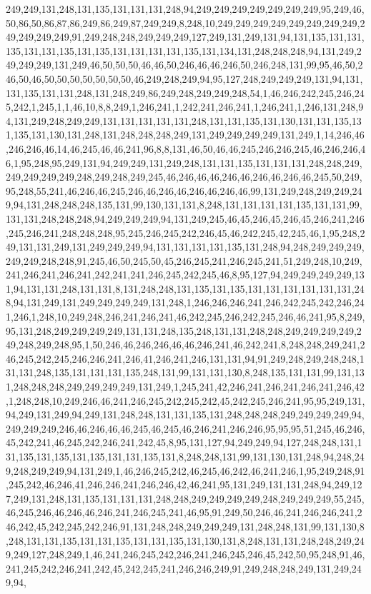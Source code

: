 249,249,131,248,131,135,131,131,131,248,94,249,249,249,249,249,249,249,95,249,46,50,86,50,86,87,86,249,86,249,87,249,249,8,248,10,249,249,249,249,249,249,249,249,249,249,249,249,91,249,248,248,249,249,249,127,249,131,249,131,94,131,135,131,131,135,131,131,135,131,135,131,131,131,131,135,131,134,131,248,248,248,94,131,249,249,249,249,131,249,46,50,50,50,46,46,50,246,46,46,246,50,246,248,131,99,95,46,50,246,50,46,50,50,50,50,50,50,50,46,249,248,249,94,95,127,248,249,249,249,131,94,131,131,135,131,131,248,131,248,249,86,249,248,249,249,248,54,1,46,246,242,245,246,245,242,1,245,1,1,46,10,8,8,249,1,246,241,1,242,241,246,241,1,246,241,1,246,131,248,94,131,249,248,249,249,131,131,131,131,131,248,131,131,135,131,130,131,131,135,131,135,131,130,131,248,131,248,248,248,249,131,249,249,249,249,131,249,1,14,246,46,246,246,46,14,46,245,46,46,241,96,8,8,131,46,50,46,46,245,246,246,245,46,246,246,46,1,95,248,95,249,131,94,249,249,131,249,248,131,131,135,131,131,131,248,248,249,249,249,249,249,248,249,248,249,245,46,246,46,46,246,46,246,46,246,46,245,50,249,95,248,55,241,46,246,46,245,246,46,246,46,246,46,246,46,99,131,249,248,249,249,249,94,131,248,248,248,135,131,99,130,131,131,8,248,131,131,131,131,135,131,131,99,131,131,248,248,248,94,249,249,249,94,131,249,245,46,45,246,45,246,45,246,241,246,245,246,241,248,248,248,95,245,246,245,242,246,45,46,242,245,42,245,46,1,95,248,249,131,131,249,131,249,249,249,94,131,131,131,131,135,131,248,94,248,249,249,249,249,249,248,248,91,245,46,50,245,50,45,246,245,241,246,245,241,51,249,248,10,249,241,246,241,246,241,242,241,241,246,245,242,245,46,8,95,127,94,249,249,249,249,131,94,131,131,248,131,131,8,131,248,248,131,135,131,135,131,131,131,131,131,131,248,94,131,249,131,249,249,249,249,131,248,1,246,246,246,241,246,242,245,242,246,241,246,1,248,10,249,248,246,241,246,241,46,242,245,246,242,245,246,46,241,95,8,249,95,131,248,249,249,249,249,131,131,248,135,248,131,131,248,248,249,249,249,249,249,248,249,248,95,1,50,246,46,246,246,46,46,246,241,46,242,241,8,248,248,249,241,246,245,242,245,246,246,241,246,41,246,241,246,131,131,94,91,249,248,249,248,248,131,131,248,135,131,131,131,135,248,131,99,131,131,130,8,248,135,131,131,99,131,131,248,248,248,249,249,249,249,131,249,1,245,241,42,246,241,246,241,246,241,246,42,1,248,248,10,249,246,46,241,246,245,242,245,242,45,242,245,246,241,95,95,249,131,94,249,131,249,94,249,131,248,248,131,131,135,131,248,248,248,249,249,249,249,94,249,249,249,246,46,246,46,46,245,46,245,46,246,241,246,246,95,95,95,51,245,46,246,45,242,241,46,245,242,246,241,242,45,8,95,131,127,94,249,249,94,127,248,248,131,131,135,131,135,131,135,131,131,135,131,8,248,248,131,99,131,130,131,248,94,248,249,248,249,249,94,131,249,1,46,246,245,242,46,245,46,242,46,241,246,1,95,249,248,91,245,242,46,246,41,246,246,241,246,246,42,46,241,95,131,249,131,131,248,94,249,127,249,131,248,131,135,131,131,131,248,248,249,249,249,249,248,249,249,249,55,245,46,245,246,46,246,46,246,241,246,245,241,46,95,91,249,50,246,46,241,246,246,241,246,242,45,242,245,242,246,91,131,248,248,249,249,249,131,248,248,131,99,131,130,8,248,131,131,135,131,131,135,131,131,135,131,130,131,8,248,131,131,248,248,249,249,249,127,248,249,1,46,241,246,245,242,246,241,246,245,246,45,242,50,95,248,91,46,241,245,242,246,241,242,45,242,245,241,246,246,249,91,249,248,248,249,131,249,249,94,